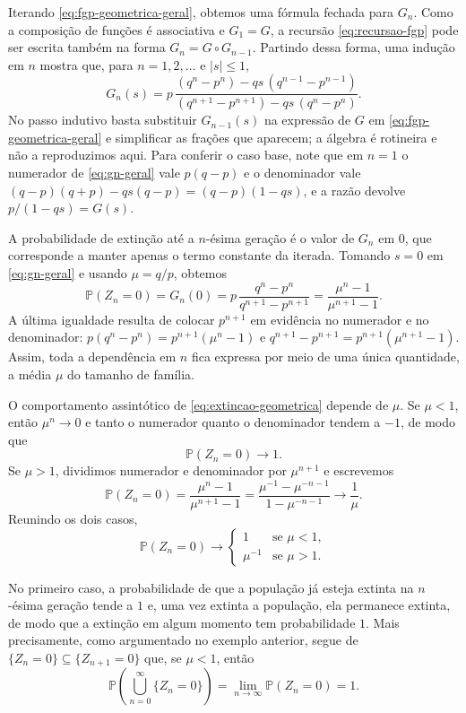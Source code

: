 \documentclass[12pt,portuguese]{article}
\theoremstyle{definition}
\theoremstyle{plainexercise}
\theoremstyle{starredexercise}
\theoremstyle{definition}
\begin{document}
\medskip

Iterando \eqref{eq:fgp-geometrica-geral}, obtemos uma fórmula fechada para
$G_n$. Como a composição de funções é associativa e $G_1=G$, a recursão
\eqref{eq:recursao-fgp} pode ser escrita também na forma
$G_n=G\circ G_{n-1}$. Partindo dessa forma, uma indução em $n$ mostra que, para
$n=1,2,\ldots$ e $|s|\leqslant 1$,
\begin{equation}\label{eq:gn-geral}
G_n(s)
=p\,\frac{(q^n-p^n)-qs\,(q^{n-1}-p^{n-1})}
{(q^{n+1}-p^{n+1})-qs\,(q^n-p^n)}.
\end{equation}
No passo indutivo basta substituir $G_{n-1}(s)$ na expressão de $G$ em
\eqref{eq:fgp-geometrica-geral} e simplificar as frações que aparecem; a
álgebra é rotineira e não a reproduzimos aqui. Para conferir o caso base, note
que em $n=1$ o numerador de \eqref{eq:gn-geral} vale $p(q-p)$ e o denominador
vale $(q-p)(q+p)-qs(q-p)=(q-p)(1-qs)$, e a razão devolve
$p/(1-qs)=G(s)$.



\medskip 
A probabilidade de extinção até a $n$-ésima geração é o valor de $G_n$ em $0$,
que corresponde a manter apenas o termo constante da iterada. Tomando $s=0$ em
\eqref{eq:gn-geral} e usando $\mu=q/p$, obtemos
\begin{equation}\label{eq:extincao-geometrica}
\mathbb{P}(Z_n=0)
=G_n(0)
=p\,\frac{q^n-p^n}{q^{n+1}-p^{n+1}}
=\frac{\mu^n-1}{\mu^{n+1}-1}.
\end{equation}
A última igualdade resulta de colocar $p^{n+1}$ em evidência no numerador e no
denominador: $p(q^n-p^n)=p^{n+1}(\mu^n-1)$ e
$q^{n+1}-p^{n+1}=p^{n+1}(\mu^{n+1}-1)$. Assim, toda a dependência em $n$ fica
expressa por meio de uma única quantidade, a média $\mu$ do tamanho de família.

O comportamento assintótico de \eqref{eq:extincao-geometrica} depende de $\mu$.
Se $\mu<1$, então $\mu^n\to 0$ e tanto o numerador quanto o denominador tendem a
$-1$, de modo que
\[
\mathbb{P}(Z_n=0)\longrightarrow 1.
\]
Se $\mu>1$, dividimos numerador e denominador por $\mu^{n+1}$ e escrevemos
\[
\mathbb{P}(Z_n=0)
=\frac{\mu^n-1}{\mu^{n+1}-1}
=\frac{\mu^{-1}-\mu^{-n-1}}{1-\mu^{-n-1}}
\longrightarrow \frac{1}{\mu}.
\]
Reunindo os dois casos,
\[
\mathbb{P}(Z_n=0)\longrightarrow
\begin{cases}
1 & \text{se } \mu<1,\\[0.2cm]
\mu^{-1} & \text{se } \mu>1.
\end{cases}
\]

No primeiro caso, a probabilidade de que a população já esteja extinta na
$n$-ésima geração tende a $1$ e, uma vez extinta a população, ela permanece
extinta, de modo que a extinção em algum momento tem probabilidade $1$.
Mais precisamente, como argumentado no exemplo anterior, segue
de $\{Z_n=0\}\subseteq \{Z_{n+1}=0\}$ que, se $\mu<1$, então
\[
\mathbb{P}\left( \bigcup_{n=0}^{\infty} \{Z_n=0\} \right)
=
\lim_{n\to\infty} \mathbb{P}(Z_n=0)
=
1.
\]
\end{document}
